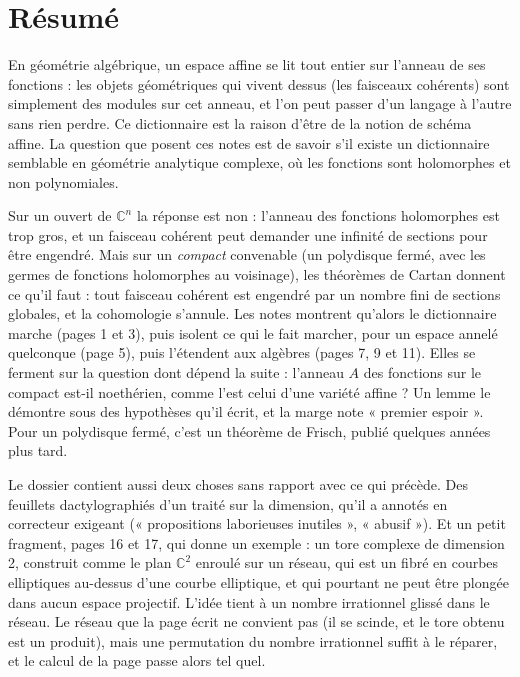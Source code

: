 \documentclass[11pt,a4paper]{article}
\begin{document}
\section*{Résumé}

\begin{resume}
En géométrie algébrique, un espace affine se lit tout entier sur l'anneau de
ses fonctions : les objets géométriques qui vivent dessus (les faisceaux
cohérents) sont simplement des modules sur cet anneau, et l'on
peut passer d'un langage à l'autre sans rien perdre. Ce dictionnaire est la
raison d'être de la notion de schéma affine. La question que posent ces notes
est de savoir s'il existe un dictionnaire semblable en géométrie analytique
complexe, où les fonctions sont holomorphes et non polynomiales.

Sur un ouvert de $\mathbb{C}^n$ la réponse est non : l'anneau des fonctions
holomorphes est trop gros, et un faisceau cohérent peut demander une infinité
de sections pour être engendré. Mais sur un \emph{compact} convenable (un
polydisque fermé, avec les germes de fonctions holomorphes au voisinage),
les théorèmes de Cartan donnent ce qu'il faut : tout faisceau
cohérent est engendré par un nombre fini de sections globales, et la
cohomologie s'annule. Les notes montrent qu'alors le dictionnaire marche
(pages 1 et 3), puis isolent ce qui le fait marcher, pour un espace annelé
quelconque (page 5), puis l'étendent aux algèbres (pages 7, 9 et 11). Elles se
ferment sur la question dont dépend la suite : l'anneau $A$ des fonctions sur le
compact est-il noethérien, comme l'est celui d'une variété affine ? Un lemme
le démontre sous des hypothèses qu'il écrit, et la marge note « premier
espoir ». Pour un polydisque fermé, c'est un théorème de Frisch, publié
quelques années plus tard.

Le dossier contient aussi deux choses sans rapport avec ce qui précède. Des
feuillets dactylographiés d'un traité sur la dimension, qu'il a annotés en
correcteur exigeant (« propositions laborieuses inutiles », « abusif »). Et un
petit fragment, pages 16 et 17, qui donne un exemple : un tore complexe de
dimension 2, construit comme le plan $\mathbb{C}^{2}$ enroulé sur un réseau, qui est un
fibré en courbes elliptiques au-dessus d'une courbe elliptique, et qui
pourtant ne peut être plongée dans aucun espace projectif. L'idée tient à un
nombre irrationnel glissé dans le réseau. Le réseau que la page écrit ne
convient pas (il se scinde, et le tore obtenu est un produit), mais une
permutation du nombre irrationnel suffit à le réparer, et le calcul de la page
passe alors tel quel.

\end{resume}
\end{document}
